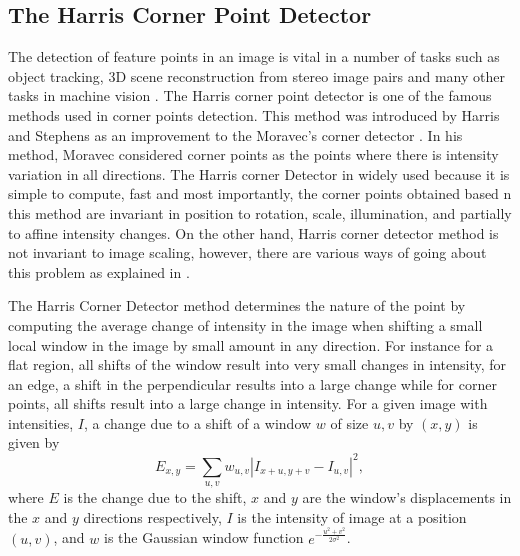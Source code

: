 \documentclass[10pt,a4paper]{article}
\theoremstyle{plain}
\theoremstyle{definition}
\begin{document}
      \subsection{The Harris Corner Point Detector}
      The detection of feature points in an image is vital in a number of tasks such as object tracking, $3$D scene reconstruction from stereo image pairs and many other tasks in machine vision \citep{trajkovic1998fast}.
      The Harris corner point detector is one of the famous methods used in corner points detection. This method was introduced by Harris and Stephens \citep{harris1988combined} as an improvement to the Moravec's corner detector \citep{moravec1979visual,moravec1980obstacle}. In his method, Moravec considered corner points as the points where there is intensity variation in all directions. The Harris corner Detector in widely used because it is simple to compute, fast and most importantly, the corner points obtained based n this method are invariant in position to rotation, scale, illumination, and partially to affine intensity changes. On the other hand, Harris corner detector method is not invariant to image scaling, however, there are various ways of going about this problem as explained in \citep{stoica2011delaunay}.
  
      The Harris Corner Detector method determines the nature of the point by computing the average change of intensity in the image when shifting a small local window in the image by small amount in any direction. For instance for a flat region, all shifts of the window result into very small changes in intensity, for an edge, a shift in the perpendicular results into a large change while for corner points, all shifts result into a large change in intensity. For a given image with intensities, $I$, a change due to a shift of a window $w$ of size $u,v$ by $(x,y)$ is given by
      \begin{equation}
      E_{x,y} = \sum_{u,v} w_{u,v} |I_{x+u, y+v} - I_{u,v}|^2,
      \end{equation}
      where $E$ is the change due to the shift, $x$ and $y$ are the window's displacements in the $x$ and $y$ directions respectively, $I$ is the intensity of image at a position $(u,v)$, and $w$ is the Gaussian window function  $e^{-\frac{u^2 + v^2}{2 \sigma^2}}$.
      
\end{document}
